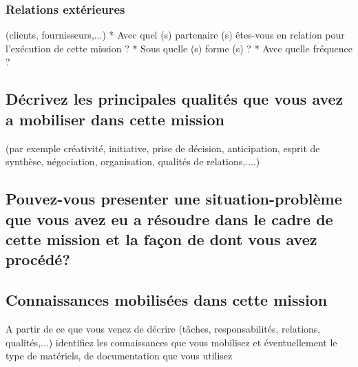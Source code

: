 \documentclass{resume} %
\begin{document}
		\subsubsection{Relations extérieures} (clients, fournisseurs,...)
* Avec quel (s) partenaire (s) êtes-vous en relation pour l'exécution de cette mission ?
* Sous quelle (s) forme (s) ?
* Avec quelle fréquence ?

	\subsection{Décrivez les principales qualités que vous avez a mobiliser dans cette mission}
(par exemple créativité, initiative, prise de décision, anticipation, esprit de synthèse, négociation, organisation, qualités de relations,....)

	\subsection{Pouvez-vous presenter une situation-problème que vous avez eu a résoudre dans le cadre de cette mission et la façon de dont vous avez procédé?}
	\subsection {Connaissances mobilisées dans cette mission }
A partir de ce que vous venez de décrire (tâches, responsabilités, relations, qualités,...) identifiez les connaissances que vous mobilisez et éventuellement le type de matériels, de documentation que vous utilisez
\end{document}
